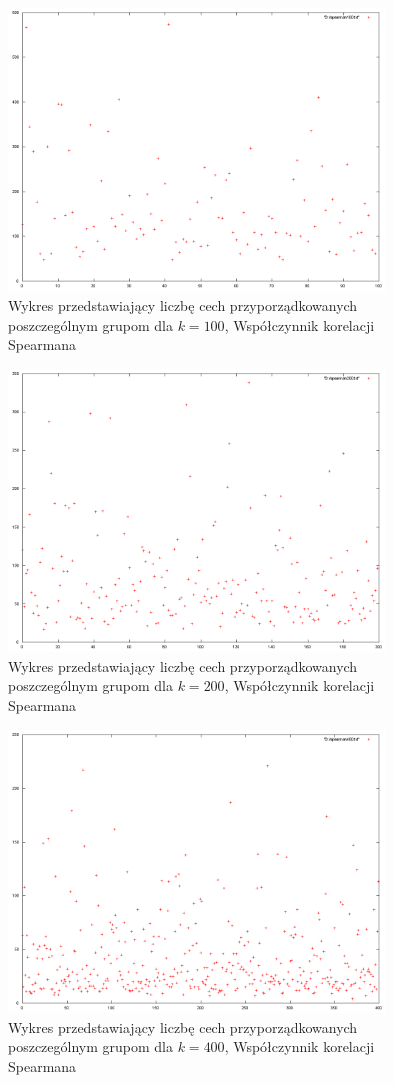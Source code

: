 \documentclass{classrep}
\begin{document}
\begin{figure}
  \centering
  \includegraphics[width=10cm]{img/spearman100.png}
  \caption{Wykres przedstawiający liczbę cech przyporządkowanych poszczególnym
grupom dla $k=100$, Współczynnik korelacji Spearmana}
  \label{spearman.100}
\end{figure}

\begin{figure}
  \centering
  \includegraphics[width=10cm]{img/spearman200.png}
  \caption{Wykres przedstawiający liczbę cech przyporządkowanych poszczególnym
grupom dla $k=200$, Współczynnik korelacji Spearmana}
  \label{spearman.200}
\end{figure}

\begin{figure}
  \centering
  \includegraphics[width=10cm]{img/spearman400.png}
  \caption{Wykres przedstawiający liczbę cech przyporządkowanych poszczególnym
grupom dla $k=400$, Współczynnik korelacji Spearmana}
  \label{spearman.400}
\end{figure}
\end{document}
